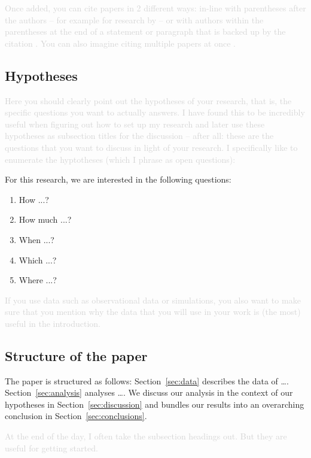 \documentclass[fleqn,usenatbib]{mnras}
\newcommand{\comment}[1]{\textcolor{lightgray}{#1}}
\begin{document}
\comment{Once added, you can cite papers in 2 different ways: in-line with parentheses after the authors -- for example for research by \citet{Buder2024b} -- or with authors within the parentheses at the end of a statement or paragraph that is backed up by the citation \citep{Buder2024b}. You can also imagine citing multiple papers at once \citep[e.g.][]{Buder2018, Buder2019, Buder2021, Buder2022, Buder2024b}.}

\subsection{Hypotheses} \label{sec:hypotheses}

\comment{Here you should clearly point out the hypotheses of your research, that is, the specific questions you want to actually answers. I have found this to be incredibly useful when figuring out how to set up my research and later use these hypotheses as subsection titles for the discussion -- after all: these are the questions that you want to discuss in light of your research. I specifically like to enumerate the hyptotheses (which I phrase as open questions):}

For this research, we are interested in the following questions:
\begin{enumerate}
    \item How ...?
    \item How much ...?
    \item When ...?
    \item Which ...?
    \item Where ...?
\end{enumerate}

\comment{If you use data such as observational data or simulations, you also want to make sure that you mention why the data that you will use in your work is (the most) useful in the introduction.}

\subsection{Structure of the paper}

The paper is structured as follows: Section~\ref{sec:data} describes the data of \dots. Section~\ref{sec:analysis} analyses \dots. We discuss our analysis in the context of our hypotheses in Section~\ref{sec:discussion} and bundles our results into an overarching conclusion in Section~\ref{sec:conclusions}.

\comment{At the end of the day, I often take the subsection headings out. But they are useful for getting started.}
\end{document}
